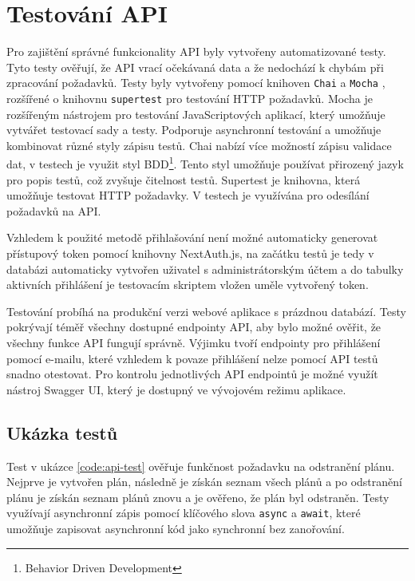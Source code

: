 \section{Testování API}

Pro zajištění správné funkcionality API byly vytvořeny automatizované testy. Tyto testy ověřují, že API vrací očekávaná data a že nedochází k chybám při zpracování požadavků.
Testy byly vytvořeny pomocí knihoven \texttt{Chai} \cite{chai} a \texttt{Mocha} \cite{mocha}, rozšířené o knihovnu \texttt{supertest} \cite{supertest} pro testování HTTP požadavků.
Mocha je rozšířeným nástrojem pro testování JavaScriptových aplikací, který umožňuje vytvářet testovací sady a testy. Podporuje asynchronní testování a umožňuje
kombinovat různé styly zápisu testů. Chai nabízí více možností zápisu validace dat, v testech je využit styl BDD\footnote{Behavior Driven Development}. Tento styl umožňuje používat přirozený jazyk
pro popis testů, což zvyšuje čitelnost testů. Supertest je knihovna, která umožňuje testovat HTTP požadavky. V testech je využívána pro odesílání požadavků na API.

Vzhledem k použité metodě přihlašování není možné automaticky generovat přístupový token pomocí knihovny NextAuth.js, na začátku testů je tedy v databázi automaticky
vytvořen uživatel s administrátorským účtem a do tabulky aktivních přihlášení je testovacím skriptem vložen uměle vytvořený token. 

Testování probíhá na produkční verzi webové aplikace s prázdnou databází. Testy pokrývají téměř všechny dostupné endpointy API, aby bylo možné
ověřit, že všechny funkce API fungují správně. Výjimku tvoří endpointy pro přihlášení pomocí e-mailu, které vzhledem k povaze přihlášení nelze 
pomocí API testů snadno otestovat. Pro kontrolu jednotlivých API endpointů je možné využít nástroj Swagger UI, který je dostupný ve vývojovém režimu aplikace.

\subsection{Ukázka testů}

Test v ukázce \ref{code:api-test} ověřuje funkčnost požadavku na odstranění plánu.
Nejprve je vytvořen plán, následně je získán seznam všech plánů a po odstranění plánu je získán seznam plánů znovu a je ověřeno, že plán byl odstraněn.
Testy využívají asynchronní zápis pomocí klíčového slova \texttt{async} a \texttt{await}, které umožňuje zapisovat asynchronní kód jako synchronní bez zanořování.


